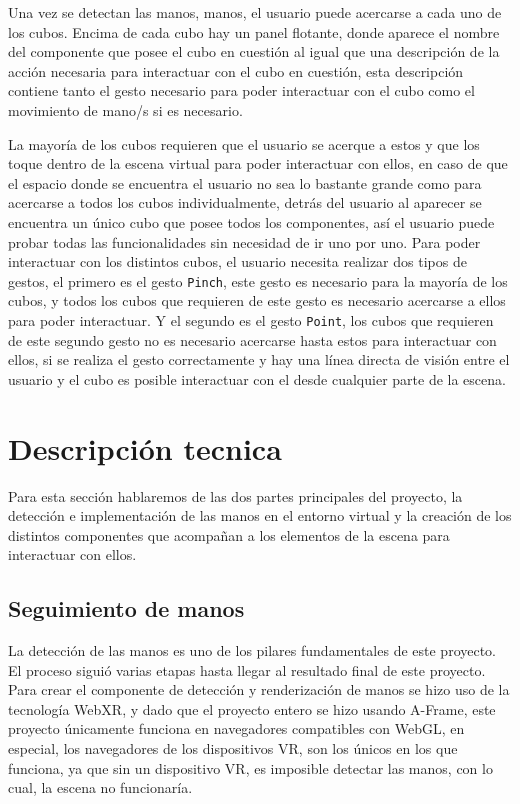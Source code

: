 \documentclass[a4paper, 12pt]{book}
\begin{document}
Una vez se detectan las manos, manos, el usuario puede acercarse a cada uno de los cubos. Encima de cada cubo hay un panel flotante, donde aparece el nombre del componente que posee el cubo en cuestión al igual que una descripción de la acción necesaria para interactuar con el cubo en cuestión, esta descripción contiene tanto el gesto necesario para poder interactuar con el cubo como el movimiento de mano/s si es necesario. 

La mayoría de los cubos requieren que el usuario se acerque a estos y que los toque dentro de la escena virtual para poder interactuar con ellos, en caso de que el espacio donde se encuentra el usuario no sea lo bastante grande como para acercarse a todos los cubos individualmente, detrás del usuario al aparecer se encuentra un único cubo que posee todos los componentes, así el usuario puede probar todas las funcionalidades sin necesidad de ir uno por uno. 
Para poder interactuar con los distintos cubos, el usuario necesita realizar dos tipos de gestos, el primero es el gesto \texttt{Pinch}, este gesto es necesario para la mayoría de los cubos, y todos los cubos que requieren de este gesto es necesario acercarse a ellos para poder interactuar. Y el segundo es el gesto \texttt{Point}, los cubos que requieren de este segundo gesto no es necesario acercarse hasta estos para interactuar con ellos, si se realiza el gesto correctamente y hay una línea directa de visión entre el usuario y el cubo es posible interactuar con el desde cualquier parte de la escena. 

\section{Descripción tecnica}
\label{sec:descripcion-tecnica}

Para esta sección hablaremos de las dos partes principales del proyecto, la detección e implementación de las manos en el entorno virtual y la creación de los distintos componentes que acompañan a los elementos de la escena para interactuar con ellos.

\subsection{Seguimiento de manos}
\label{subsec:handtracking}
La detección de las manos es uno de los pilares fundamentales de este proyecto. El proceso siguió varias etapas hasta llegar al resultado final de este proyecto. Para crear el componente de detección y renderización de manos se hizo uso de la tecnología WebXR, y dado que el proyecto entero se hizo usando A-Frame, este proyecto únicamente funciona en navegadores compatibles con WebGL, en especial, los navegadores de los dispositivos VR, son los únicos en los que funciona, ya que sin un dispositivo VR, es imposible detectar las manos, con lo cual, la escena no funcionaría.
\end{document}
